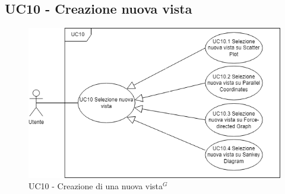 \subsection{UC10 - Creazione nuova vista}
\label{sec:UC10}
\begin{figure}[h!]
    \centering
    \includegraphics[scale=0.60]{../../assets/creazione_nuova_vista.png}
    \caption{UC10 - Creazione di una nuova vista$^{G}$}
\end{figure}
